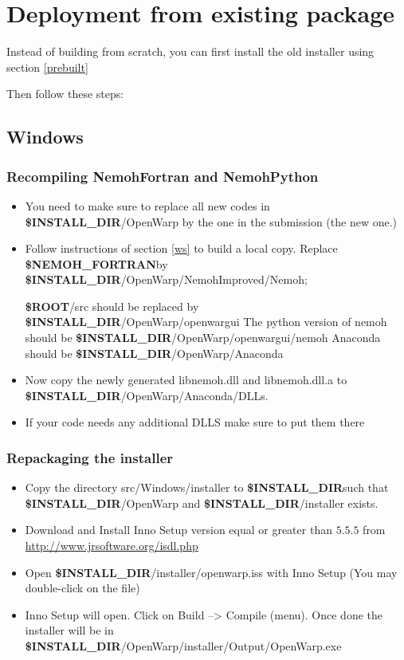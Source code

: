 \documentclass[12pt]{article}
\newcommand{\ROOT}{{\textbf{\$ROOT}}}
\newcommand{\NEMOHFORTRAN}{{\textbf{\$NEMOH{\_}FORTRAN}}}
\newcommand{\INSTALLDIR}{{\textbf{\$INSTALL{\_}DIR}}}
\begin{document}
\section{Deployment from existing package }

Instead of building from scratch, you can first install the old installer using section \ref{prebuilt}

Then follow these steps:

\subsection{Windows}

\subsubsection{Recompiling NemohFortran and NemohPython}
\begin{itemize}
	\item You need to make sure to replace all new codes in \INSTALLDIR/OpenWarp by the one in the submission (the new one.)
 \item Follow instructions of section \ref{ws} to build a local copy.
  Replace \NEMOHFORTRAN by \INSTALLDIR/OpenWarp/NemohImproved/Nemoh;
  
\ROOT/src should be replaced by \INSTALLDIR/OpenWarp/openwargui
The python version of nemoh should be \INSTALLDIR/OpenWarp/openwargui/nemoh Anaconda should be \INSTALLDIR/OpenWarp/Anaconda
\item  Now copy the newly generated libnemoh.dll and libnemoh.dll.a to \INSTALLDIR/OpenWarp/Anaconda/DLLs. 

\item If your code needs any additional DLLS make sure to put them there
\end{itemize}

\subsubsection{Repackaging the installer}
\begin{itemize}
	\item Copy the directory src/Windows/installer to \INSTALLDIR such that \INSTALLDIR/OpenWarp and \INSTALLDIR/installer exists.
\item Download and Install Inno Setup version equal or greater than $5.5.5$ from \url{http://www.jrsoftware.org/isdl.php}
\item Open \INSTALLDIR/installer/openwarp.iss with Inno Setup (You may double-click on the file)
\item Inno Setup will open. Click on Build --> Compile (menu). Once done the installer will be in
\INSTALLDIR/OpenWarp/installer/Output/OpenWarp.exe
\end{itemize}
\end{document}
